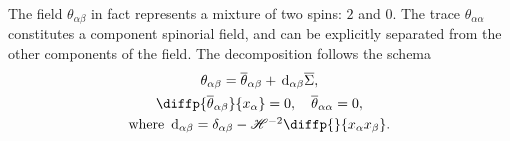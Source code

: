 \documentclass{article}
\newcommand{\HH}{\mathscr{H}}
\renewcommand{\d}{\,\mathrm{d}}
\begin{document}
\medskip\hrulefill\bigskip

The field $\theta_{\alpha\beta}$ in fact represents a mixture of two spins: $2$ and $0$.
The trace $\theta_{\alpha\alpha}$ constitutes a component spinorial field, and can be explicitly separated from the other components of the field.
The decomposition follows the schema
\begin{gather*}
  \theta_{\alpha\beta} = \overline{\theta}_{\alpha\beta} + \d_{\alpha\beta}\overline{\Sigma},
\\\diffp{{\overline{\theta}_{\alpha\beta}}}{{x_\alpha}} = 0,
  \quad \overline{\theta}_{\alpha\alpha} = 0,
\\\mbox{where $\d_{\alpha\beta}=\delta_{\alpha\beta}-\HH^{-2}\diffp{}{{x_\alpha}{x_\beta}}$.}
\end{gather*}
\end{document}
